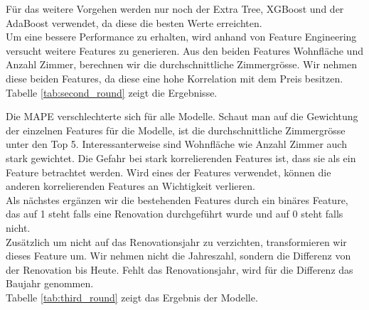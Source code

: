 %
Für das weitere Vorgehen werden nur noch der Extra Tree, XGBoost und der AdaBoost verwendet, da diese die besten Werte erreichten.\\[2ex]
%
Um eine bessere Performance zu erhalten, wird anhand von Feature Engineering versucht weitere Features zu generieren. Aus den beiden Features Wohnfläche und Anzahl Zimmer, berechnen wir die durchschnittliche Zimmergrösse. Wir nehmen diese beiden Features, da diese eine hohe Korrelation mit dem Preis besitzen. Tabelle \ref{tab:second_round} zeigt die Ergebnisse.\\[2ex]
%
\begin{table}[ht]
\centering
{}
\caption{Ergebnisse mit durchschnittlicher Zimmergrösse}
\label{tab:second_round}
\end{table}
%
Die MAPE verschlechterte sich für alle Modelle. Schaut man auf die Gewichtung der einzelnen Features für die Modelle, ist die durchschnittliche Zimmergrösse unter den Top 5. Interessanterweise sind Wohnfläche wie Anzahl Zimmer auch stark gewichtet. Die Gefahr bei stark korrelierenden Features ist, dass sie als ein Feature betrachtet werden. Wird eines der Features verwendet, können die anderen korrelierenden Features an Wichtigkeit verlieren.\\[2ex] 
%
Als nächstes ergänzen wir die bestehenden Features durch ein binäres Feature, das auf 1 steht falls eine Renovation durchgeführt wurde und auf 0 steht falls nicht.\\
Zusätzlich um nicht auf das Renovationsjahr zu verzichten, transformieren wir dieses Feature um. Wir nehmen nicht die Jahreszahl, sondern die Differenz von der Renovation bis Heute. Fehlt das Renovationsjahr, wird für die Differenz das Baujahr genommen.\\
Tabelle \ref{tab:third_round} zeigt das Ergebnis der Modelle.\\[2ex]
%
\begin{table}[ht]
\centering
{}
\caption{Ergebnisse mit Einbezug der Renovation}
\label{tab:third_round}
\end{table}
